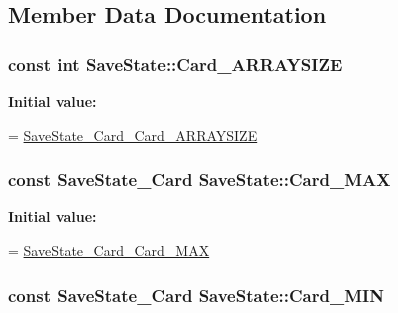 \subsection{Member Data Documentation}
\hypertarget{class_save_state_a31127722479705d6093311c6e3957cf5}{
\subsubsection[{Card\-\_\-\-A\-R\-R\-A\-Y\-S\-I\-Z\-E}]{\setlength{\rightskip}{0pt plus 5cm}const int Save\-State\-::\-Card\-\_\-\-A\-R\-R\-A\-Y\-S\-I\-Z\-E\hspace{0.3cm}{\ttfamily [static]}}}\label{class_save_state_a31127722479705d6093311c6e3957cf5}
{\bfseries Initial value\-:}
\begin{DoxyCode}
=
    \hyperlink{savestate_8pb_8h_a8ecf81b1721ab794c2687f985da56cdb}{SaveState\_Card\_Card\_ARRAYSIZE}
\end{DoxyCode}
\hypertarget{class_save_state_ac6958bff2bc49eac49f8ec5adf1801d7}{
\subsubsection[{Card\-\_\-\-M\-A\-X}]{\setlength{\rightskip}{0pt plus 5cm}const {\bf Save\-State\-\_\-\-Card} Save\-State\-::\-Card\-\_\-\-M\-A\-X\hspace{0.3cm}{\ttfamily [static]}}}\label{class_save_state_ac6958bff2bc49eac49f8ec5adf1801d7}
{\bfseries Initial value\-:}
\begin{DoxyCode}
=
    \hyperlink{savestate_8pb_8h_afbe29090b6b0af43dce17cc83c566170}{SaveState\_Card\_Card\_MAX}
\end{DoxyCode}
\hypertarget{class_save_state_a7e057bef2422d7071e567df68abe4df9}{
\subsubsection[{Card\-\_\-\-M\-I\-N}]{\setlength{\rightskip}{0pt plus 5cm}const {\bf Save\-State\-\_\-\-Card} Save\-State\-::\-Card\-\_\-\-M\-I\-N\hspace{0.3cm}{\ttfamily [static]}}}\label{class_save_state_a7e057bef2422d7071e567df68abe4df9}
